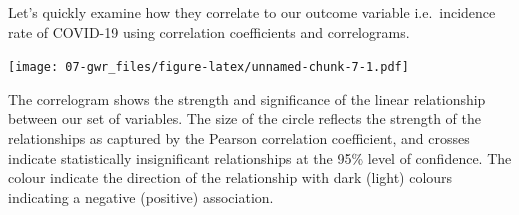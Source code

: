 \documentclass[]{book}
\newenvironment{Shaded}{\begin{snugshade}}{\end{snugshade}}
\newcommand{\KeywordTok}[1]{\textcolor[rgb]{0.13,0.29,0.53}{\textbf{#1}}}
\newcommand{\DataTypeTok}[1]{\textcolor[rgb]{0.13,0.29,0.53}{#1}}
\newcommand{\DecValTok}[1]{\textcolor[rgb]{0.00,0.00,0.81}{#1}}
\newcommand{\FloatTok}[1]{\textcolor[rgb]{0.00,0.00,0.81}{#1}}
\newcommand{\StringTok}[1]{\textcolor[rgb]{0.31,0.60,0.02}{#1}}
\newcommand{\CommentTok}[1]{\textcolor[rgb]{0.56,0.35,0.01}{\textit{#1}}}
\newcommand{\OtherTok}[1]{\textcolor[rgb]{0.56,0.35,0.01}{#1}}
\newcommand{\OperatorTok}[1]{\textcolor[rgb]{0.81,0.36,0.00}{\textbf{#1}}}
\newcommand{\NormalTok}[1]{#1}
\begin{document}
Let's quickly examine how they correlate to our outcome variable
i.e.~incidence rate of COVID-19 using correlation coefficients and
correlograms.

\begin{Shaded}
\end{Shaded}

\texttt{[image: 07-gwr\_files/figure-latex/unnamed-chunk-7-1.pdf]}

The correlogram shows the strength and significance of the linear
relationship between our set of variables. The size of the circle
reflects the strength of the relationships as captured by the Pearson
correlation coefficient, and crosses indicate statistically
insignificant relationships at the 95\% level of confidence. The colour
indicate the direction of the relationship with dark (light) colours
indicating a negative (positive) association.
\end{document}
